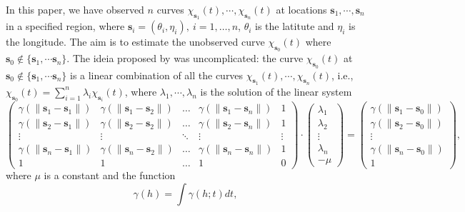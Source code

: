 \documentclass[12pt]{interact}
\theoremstyle{plain}%
\theoremstyle{definition}
\theoremstyle{remark}
\begin{document}
In this paper, we have observed \(n\) curves \(\chi_{\bm{s}_1}(t), \cdots, \chi_{\bm{s}_n}(t)\) at locations \(\bm{s}_1, \cdots, \bm{s}_n\) in a specified region,
where \(\bm{s}_i = (\theta_i, \eta_i), \ i =1, \dots, n\), \(\theta_i\) is the latitute and \(\eta_i\) is the longitude. The aim is to estimate the unobserved curve
\(\chi_{\bm{s}_0}(t)\) where \(\bm{s}_0 \not\in \{\bm{s}_1, \cdots \bm{s}_n \}\). The ideia proposed by \cite{giraldo2011ordinary} was uncomplicated:
the curve \(\chi_{\bm{s}_0}(t)\) at \(\bm{s}_0 \not\in \{\bm{s}_1, \cdots \bm{s}_n \}\) is a linear combination of all the curves \(\chi_{\bm{s}_1}(t), \cdots, \chi_{\bm{s}_n}(t)\), i.e.,
\(\chi_{\bm{s}_0}(t) = \sum_{i=1}^{n} \lambda_i \chi_{\bm{s}_i}(t)\), where \(\lambda_1, \cdots, \lambda_n\) is the solution of the linear system
\begin{equation*}
\begin{pmatrix}
\gamma(\lVert\bm{s}_1 - \bm{s}_1\rVert) & \gamma(\lVert\bm{s}_1 - \bm{s}_2\rVert) & \dots & \gamma(\lVert\bm{s}_{1} - \bm{s}_n\rVert) & 1\\
\gamma(\lVert\bm{s}_2 - \bm{s}_1\rVert) & \gamma(\lVert\bm{s}_2 - \bm{s}_2\rVert) & \dots & \gamma(\lVert\bm{s}_{2} - \bm{s}_n\rVert) & 1\\
\vdots & \vdots & \ddots & \vdots &\vdots\\
\gamma(\lVert\bm{s}_{n} - \bm{s}_1\rVert) & \gamma(\lVert\bm{s}_{n} - \bm{s}_2\rVert) & \dots & \gamma(\lVert\bm{s}_{n} - \bm{s}_{n}\rVert) & 1\\
1 & 1 & \dots & 1 & 0
\end{pmatrix} 
\cdot 
\begin{pmatrix}
\lambda_1\\
\lambda_2\\
\vdots\\
\lambda_{n}\\
-\mu
\end{pmatrix} 
=
\begin{pmatrix}
\gamma(\lVert\bm{s}_1 - \bm{s}_0\rVert)\\
\gamma(\lVert\bm{s}_2 - \bm{s}_0\rVert)\\
\vdots\\
\gamma(\lVert\bm{s}_{n}- \bm{s}_0\rVert)\\
1
\end{pmatrix},
\end{equation*}
where \(\mu\) is a constant and the function
\begin{equation} \label{eq:trace_intro}
\gamma(h) = \int \gamma(h;t)dt,
\end{equation}
\end{document}
